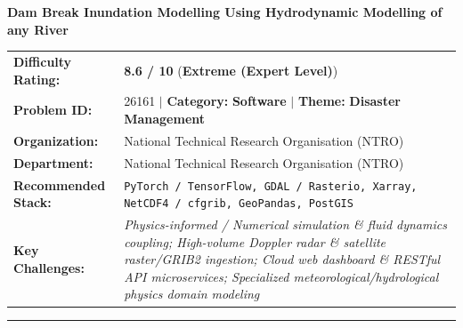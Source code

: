 \documentclass[10pt,a4paper]{article}
\begin{document}
\begin{tcolorbox}[pscard, title={"\textbf{SIH26161} \quad $\vert$ \quad Dam Break Inundation Modelling Using Hydrodynamic Modelling of any River}]
\textbf{\large Dam Break Inundation Modelling Using Hydrodynamic Modelling of any River}\\[0.25cm]

\begin{tabular}{@{}lp{12.5cm}@{}}
\textbf{Difficulty Rating:} & \textcolor{diffextreme}{\textbf{\Large 8.6 / 10}} \quad (\textbf{Extreme (Expert Level)}) \\
\textbf{Problem ID:} & 26161 \quad $\vert$ \quad \textbf{Category:} \textbf{Software} \quad $\vert$ \quad \textbf{Theme:} \textbf{Disaster Management} \\
\textbf{Organization:} & National Technical Research Organisation (NTRO) \\
\textbf{Department:} & National Technical Research Organisation (NTRO) \\
\textbf{Recommended Stack:} & \texttt{PyTorch / TensorFlow, GDAL / Rasterio, Xarray, NetCDF4 / cfgrib, GeoPandas, PostGIS} \\
\textbf{Key Challenges:} & \textit{\small Physics-informed / Numerical simulation \& fluid dynamics coupling; High-volume Doppler radar \& satellite raster/GRIB2 ingestion; Cloud web dashboard \& RESTful API microservices; Specialized meteorological/hydrological physics domain modeling} \\
\end{tabular}

\vspace{0.2cm}
\hrule
\vspace{0.2cm}


\end{tcolorbox}
\end{document}
